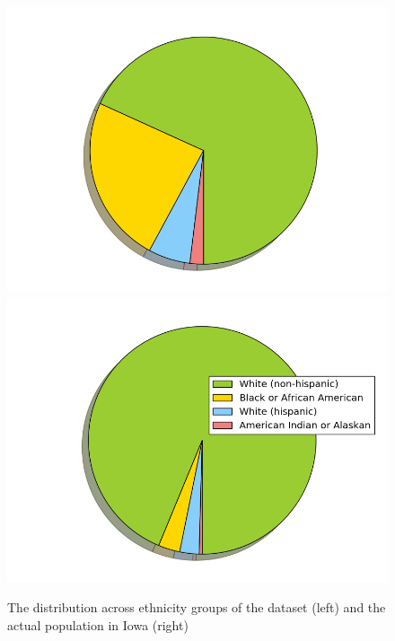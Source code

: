 \documentclass[conference]{IEEEtran}
\begin{document}
\begin{figure}
    \centering
\includegraphics[scale=0.2]{figure_2.png}
\includegraphics[scale=0.2]{figure_1.png}
    \caption{The distribution across ethnicity groups of the dataset (left) and the actual population in Iowa (right)}
    \label{fig:mesh1}
\end{figure}
\end{document}
